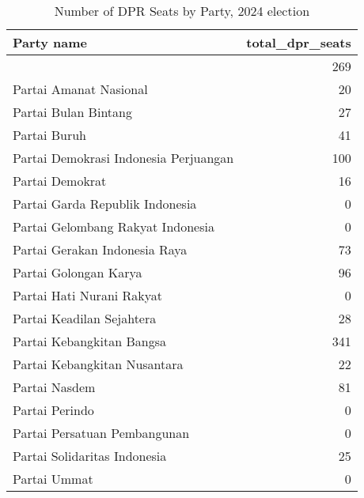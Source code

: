
\begin{longtable}[t]{lr}
\caption{Number of DPR Seats by Party, 2024 election}\\
\toprule
Party name & total\_dpr\_seats\\
\midrule
 & 269\\
Partai Amanat Nasional & 20\\
Partai Bulan Bintang & 27\\
Partai Buruh & 41\\
Partai Demokrasi Indonesia Perjuangan & 100\\
\addlinespace
Partai Demokrat & 16\\
Partai Garda Republik Indonesia & 0\\
Partai Gelombang Rakyat Indonesia & 0\\
Partai Gerakan Indonesia Raya & 73\\
Partai Golongan Karya & 96\\
\addlinespace
Partai Hati Nurani Rakyat & 0\\
Partai Keadilan Sejahtera & 28\\
Partai Kebangkitan Bangsa & 341\\
Partai Kebangkitan Nusantara & 22\\
Partai Nasdem & 81\\
\addlinespace
Partai Perindo & 0\\
Partai Persatuan Pembangunan & 0\\
Partai Solidaritas Indonesia & 25\\
Partai Ummat & 0\\
\bottomrule
\end{longtable}

